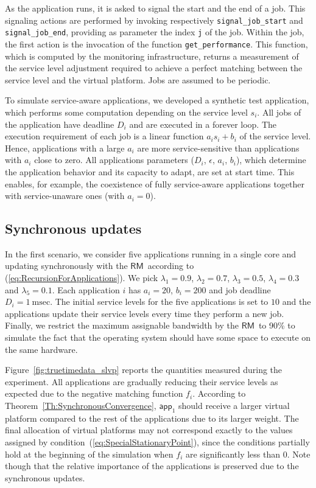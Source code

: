 \documentclass[letter,11pt]{article}
\begin{document}
As the application runs, it is  asked to signal the start 
and the end of a job. This signaling actions are performed by invoking 
respectively \texttt{signal\_job\_start} and \texttt{signal\_job\_end}, 
providing as parameter the index \texttt{j} of the job. 
Within the job, the first action is the invocation of the function
\texttt{get\_performance}. This function, which is computed by the monitoring infrastructure,
returns a measurement of the service level adjustment required to
achieve a perfect matching between the service level and the virtual
platform. Jobs are assumed to be periodic.

To simulate service-aware applications, we developed a synthetic test
application, which performs some computation 
depending on the service level $s_i$. All jobs of the application have
deadline $D_i$ and are executed in a forever loop.  The execution
requirement of each job is a linear function $a_i s_i + b_i$ of the
service level.
Hence, applications with a large $a_i$ are more service-sensitive than
applications with $a_i$ close to zero.  
All applications parameters ($D_i$, $\epsilon$, $a_i$,
$b_i$), which determine the application behavior and its capacity to
adapt, are set at start time. This enables, for example, the
coexistence of fully service-aware applications together with
service-unaware ones (with $a_i=0$).

\subsection{Synchronous updates}

In the first scenario, we consider five applications running in a single core and updating synchronously with the {$\mathsf{RM}$}\ according to (\ref{eq:RecursionForApplications}). We pick $\lambda_{1}=0.9$, $\lambda_{2}=0.7$, $\lambda_{3}=0.5$, $\lambda_{4}=0.3$ and $\lambda_{5}=0.1$. Each application $i$ has $a_i\!\!=20$, $b_i\!\!=200$ and job deadline $D_i=1\ \text{msec}$. The initial service levels for the five applications is set to $10$ and the applications update their service levels every time they perform a new job. Finally, we restrict the maximum assignable bandwidth by the {$\mathsf{RM}$}\ to 90\% to simulate the fact that the operating system should have some space to execute on the same hardware. 

Figure~\ref{fig:truetimedata_slvp} reports the quantities measured during the experiment. All applications are gradually reducing their service levels as expected due to the negative matching function $f_i$. According to Theorem~\ref{Th:SynchronousConvergence}, $\mathsf{app}_1$ should receive a larger virtual platform compared to the rest of the applications due to its larger weight. The final allocation of virtual platforms may not correspond exactly to the values assigned by condition~(\ref{eq:SpecialStationaryPoint}), since the conditions partially hold at the beginning of the simulation when $f_i$ are significantly less than 0. Note though that the relative importance of the applications is preserved due to the synchronous updates.
\end{document}
